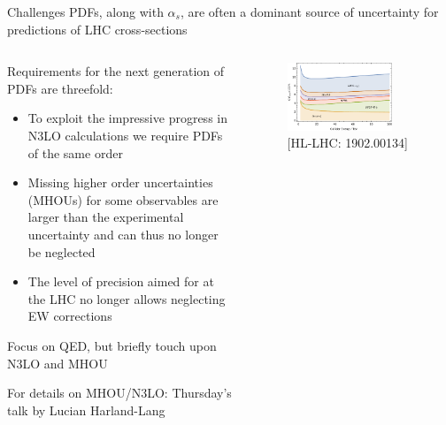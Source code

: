 \documentclass[aspectratio=169, 8pt,t]{beamer}
\begin{document}
\begin{frame}{Challenges}
  PDFs, along with $\alpha_s$, are often a dominant source of uncertainty for predictions of LHC cross-sections 
  \begin{columns}
    \begin{column}{0.49\textwidth}
      \vspace*{1em}

      Requirements for the next generation of PDFs are threefold:
      \begin{itemize}
        \item To exploit the impressive progress in N3LO calculations we require PDFs of the same order
        \item Missing higher order uncertainties (MHOUs) for some observables are larger than the experimental uncertainty and can thus no longer be neglected
        \item The level of precision aimed for at the LHC no longer allows neglecting EW corrections
      \end{itemize}

      \vspace*{1em}
      Focus on QED, but briefly touch upon N3LO and MHOU

      \vspace*{0.5em}
      For details on MHOU/N3LO: Thursday's talk by Lucian Harland-Lang 
    \end{column}

    \begin{column}{0.49\textwidth}
      \begin{figure}
        \includegraphics[width=0.8\textwidth]{figures/sources_of_unceratinty.pdf}
        \caption*{\color{gray} [HL-LHC: 1902.00134]}
      \end{figure}
    \end{column}
  \end{columns}
\end{frame}
\end{document}
